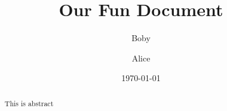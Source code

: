 \documentclass[12pt, a4paper]{report}
\begin{document}


\title{Our Fun Document}
\author{Boby \and Alice}
\date{\today}
\maketitle

\renewcommand{\abstractname}{New abstract \LaTeX{} title}
\begin{abstract}

    This is abstract
    \lipsum[1]

\end{abstract}


\renewcommand{\contentsname}{** Table of Contents **}
\tableofcontents

\renewcommand{\listtablename}{** List of Figures **}
\renewcommand{\listfigurename}{** List of Tables **}
\listoffigures
\listoftables

\end{document}
